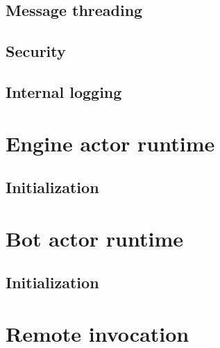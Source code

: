 \documentclass[11pt,a4paper,oneside]{report}
\begin{document}
		\subsection*{Message threading}

		\subsection*{Security}
		
		\subsection*{Internal logging}
		
	\section{Engine actor runtime}

		\subsection*{Initialization}

	\section{Bot actor runtime}
	
		\subsection*{Initialization}

	\section{Remote invocation}
\end{document}
